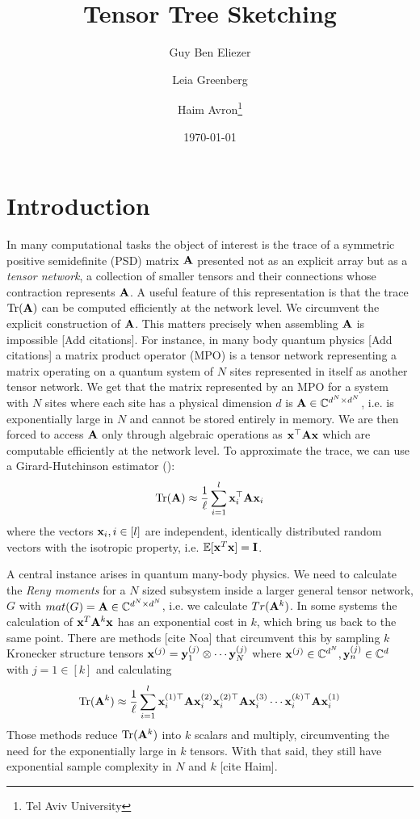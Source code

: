 \documentclass[11pt]{article}
\title{Tensor Tree Sketching}
\author{%
  Guy Ben Eliezer \and
  Leia Greenberg \and
  Haim Avron\thanks{Tel Aviv University}
}
\date{\today}
\theoremstyle{plain}
\theoremstyle{definition}
\theoremstyle{remark}
\begin{document}
\maketitle
\tableofcontents
\leanmodebanner

\section{Introduction}
\label{sec:introduction}

In many computational tasks the object of interest is the trace of a symmetric positive
semidefinite (PSD) matrix $\mathbf{A}$ presented not as an explicit array but as
a \emph{tensor network}, a collection of smaller tensors and their connections whose contraction
represents $\mathbf{A}$. A useful feature of this representation is that the trace $\mathop{\mathrm{Tr}}(\mathbf{A})$ can be computed efficiently at the network level. We circumvent the explicit construction of $\mathbf{A}$. This matters precisely when assembling $\mathbf{A}$ is impossible {\color{red} [Add citations]}.
For instance, in many body quantum physics {\color{red} [Add citations]} a matrix product
operator (MPO) is a tensor network representing a matrix operating on a quantum system of $N$ sites represented in itself as another tensor network. We get that the matrix represented by an MPO for a system with $N$  sites where each site has a physical dimension $d$ is $\mathbf{A}\in\mathbb{C}^{d^{N}\times d^{N}}$, i.e. is exponentially large in $N$ and cannot be stored entirely in memory. We are then forced to access $\mathbf{A}$ only through algebraic operations as $\mathbf{\boldsymbol{x}}^{\top}\mathbf{A}\mathbf{\boldsymbol{x}}$ which are computable efficiently at the network level. 
To approximate the trace, we can use a Girard-Hutchinson estimator (\cite{girard1989, hutchinson1989}): $$\mathop{\mathrm{Tr}}(\mathbf{A})\approx\frac1\ell\sum_{i=1}^l\mathbf{\boldsymbol{x}}_{i}^{\top}\mathbf{A}\mathbf{\boldsymbol{x}}_{i}$$ 
where the vectors $\mathbf{\boldsymbol{x}}_{i}, i\in[l]$  are independent, identically distributed random vectors with the isotropic property, i.e. $\mathbb{E}[\mathbf{\boldsymbol{x}}^T\mathbf{\boldsymbol{x}}]=\mathbf{I}$.

A central instance arises in quantum many-body physics. We need to calculate the \emph{Reny moments} for a $N$ sized subsystem inside a larger general tensor network, $G$ with $mat(G)=\mathbf{A}\in \mathbb{C}^{d^N\times d^N}$, i.e.  we calculate $Tr(\mathbf{A}^k)$. In some systems the calculation of $\mathbf{\boldsymbol{x}}^T\mathbf{A}^k\mathbf{\boldsymbol{x}}$  has an exponential cost in $k$, which bring us back to the same point. 
There are methods {\color{red} [cite Noa]} that circumvent this by sampling $k$  Kronecker structure tensors $\mathbf{\boldsymbol{x}}^{(j)}=\mathbf{\boldsymbol{y}}_1^{(j)}\otimes\cdots \mathbf{\boldsymbol{y}}_N^{(j)}$ where $\mathbf{\boldsymbol{x}}^{(j)}\in \mathbb{C}^{d^N},\mathbf{\boldsymbol{y}}_n^{(j)}\in \mathbb{C}^d$ with $j=1\in[k]$  and calculating $$\mathop{\mathrm{Tr}}(\mathbf{A}^k)\approx\frac1\ell\sum_{i=1}^l\mathbf{\boldsymbol{x}}_{i}^{(1)\top}\mathbf{A}\mathbf{\boldsymbol{x}}_{i}^{(2)}\mathbf{\boldsymbol{x}}_{i}^{(2)\top}\mathbf{A}\mathbf{\boldsymbol{x}}_i^{(3)}\cdots \mathbf{\boldsymbol{x}}_i^{(k)\top}\mathbf{A}\mathbf{\boldsymbol{x}}_i^{(1)}$$
Those methods reduce $\mathop{\mathrm{Tr}}(\mathbf{A}^k)$  into $k$  scalars and multiply, circumventing the need for the exponentially large in $k$ tensors. With that said, they still have exponential sample complexity in $N$ and $k$ {\color{red} [cite Haim]}.
\end{document}
